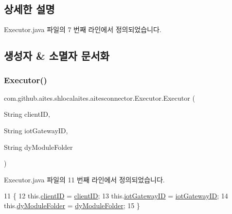 \subsection{상세한 설명}


Executor.\+java 파일의 7 번째 라인에서 정의되었습니다.



\subsection{생성자 \& 소멸자 문서화}
\mbox{\label{classcom_1_1github_1_1aites_1_1shlocalaites_1_1aitesconnector_1_1_executor_ade1fa391f55b662daac15fae51b98dda}} 
\subsubsection{\texorpdfstring{Executor()}{Executor()}}
{\footnotesize\ttfamily com.\+github.\+aites.\+shlocalaites.\+aitesconnector.\+Executor.\+Executor (\begin{DoxyParamCaption}\item[{String}]{client\+ID,  }\item[{String}]{iot\+Gateway\+ID,  }\item[{String}]{dy\+Module\+Folder }\end{DoxyParamCaption})}



Executor.\+java 파일의 11 번째 라인에서 정의되었습니다.


\begin{DoxyCode}
11                                                                               \{
12         this.\mbox{\hyperlink{classcom_1_1github_1_1aites_1_1shlocalaites_1_1aitesconnector_1_1_executor_a1f8892f17413f1001a35650585deb2c6}{clientID}} = \mbox{\hyperlink{classcom_1_1github_1_1aites_1_1shlocalaites_1_1aitesconnector_1_1_executor_a1f8892f17413f1001a35650585deb2c6}{clientID}};
13         this.\mbox{\hyperlink{classcom_1_1github_1_1aites_1_1shlocalaites_1_1aitesconnector_1_1_executor_ac83ca28f1a24d45b2e4f1890fc9f8491}{iotGatewayID}} = \mbox{\hyperlink{classcom_1_1github_1_1aites_1_1shlocalaites_1_1aitesconnector_1_1_executor_ac83ca28f1a24d45b2e4f1890fc9f8491}{iotGatewayID}};
14         this.\mbox{\hyperlink{classcom_1_1github_1_1aites_1_1shlocalaites_1_1aitesconnector_1_1_executor_a071d3608be94d2e9f089119d191a3aa1}{dyModuleFolder}} = \mbox{\hyperlink{classcom_1_1github_1_1aites_1_1shlocalaites_1_1aitesconnector_1_1_executor_a071d3608be94d2e9f089119d191a3aa1}{dyModuleFolder}};
15     \}
\end{DoxyCode}



